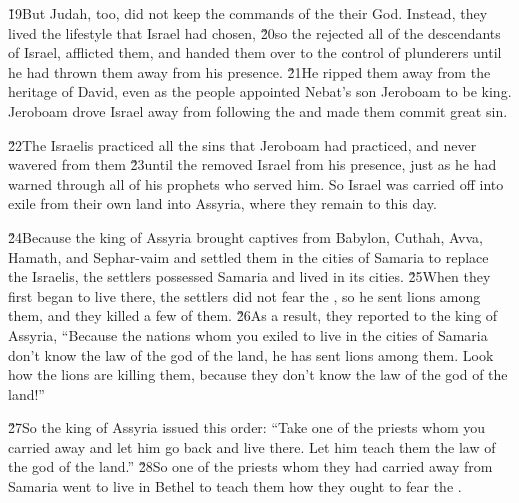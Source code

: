 \v{19}But Judah, too, did not keep the commands of the  their God. Instead, they lived the lifestyle that Israel had chosen, \v{20}so the  rejected all of the descendants of Israel, afflicted them, and handed them over to the control of plunderers until he had thrown them away from his presence. \v{21}He ripped them away from the heritage of David, even as the people appointed Nebat's son Jeroboam to be king. Jeroboam drove Israel away from following the  and made them commit great sin.

\v{22}The Israelis practiced all the sins that Jeroboam had practiced, and never wavered from them \v{23}until the  removed Israel from his presence, just as he had warned through all of his prophets who served him. So Israel was carried off into exile from their own land into Assyria, where they remain to this day.

\v{24}Because the king of Assyria brought captives from Babylon, Cuthah, Avva, Hamath, and Sephar-vaim and settled them in the cities of Samaria to replace the Israelis, the settlers possessed Samaria and lived in its cities. \v{25}When they first began to live there, the settlers did not fear the , so he sent lions among them, and they killed a few of them. \v{26}As a result, they reported to the king of Assyria, ``Because the nations whom you exiled to live in the cities of Samaria don't know the law of the god of the land, he has sent lions among them. Look how the lions are killing them, because they don't know the law of the god of the land!''

\v{27}So the king of Assyria issued this order: ``Take one of the priests whom you carried away and let him go back and live there. Let him teach them the law of the god of the land.'' \v{28}So one of the priests whom they had carried away from Samaria went to live in Bethel to teach them how they ought to fear the .

